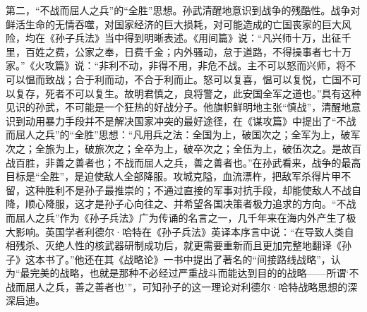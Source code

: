 \documentclass[12pt,UTF8]{ctexbook}
\begin{document}
第二，“不战而屈人之兵”的“全胜”思想。孙武清醒地意识到战争的残酷性。战争对鲜活生命的无情吞噬，对国家经济的巨大损耗，对可能造成的亡国丧家的巨大风险，均在《孙子兵法》当中得到明晰表述。《用间篇》说：“凡兴师十万，出征千里，百姓之费，公家之奉，日费千金；内外骚动，怠于道路，不得操事者七十万家。”《火攻篇》说：“非利不动，非得不用，非危不战。主不可以怒而兴师，将不可以愠而致战；合于利而动，不合于利而止。怒可以复喜，愠可以复悦，亡国不可以复存，死者不可以复生。故明君慎之，良将警之，此安国全军之道也。”具有这种见识的孙武，不可能是一个狂热的好战分子。他旗帜鲜明地主张“慎战”，清醒地意识到动用暴力手段并不是解决国家冲突的最好途径，在《谋攻篇》中提出了“不战而屈人之兵”的“全胜”思想：“凡用兵之法：全国为上，破国次之；全军为上，破军次之；全旅为上，破旅次之；全卒为上，破卒次之；全伍为上，破伍次之。是故百战百胜，非善之善者也；不战而屈人之兵，善之善者也。”在孙武看来，战争的最高目标是“全胜”，是迫使敌人全部降服。攻城克隘，血流漂杵，把敌军杀得片甲不留，这种胜利不是孙子最推崇的；不通过直接的军事对抗手段，却能使敌人不战自降，顺心降服，这才是孙子心向往之、并希望各国决策者极力追求的方向。“不战而屈人之兵”作为《孙子兵法》广为传诵的名言之一，几千年来在海内外产生了极大影响。英国学者利德尔·哈特在《孙子兵法》英译本序言中说：“在导致人类自相残杀、灭绝人性的核武器研制成功后，就更需要重新而且更加完整地翻译《孙子》这本书了。”他还在其《战略论》一书中提出了著名的“间接路线战略”，认为“最完美的战略，也就是那种不必经过严重战斗而能达到目的的战略——所谓‘不战而屈人之兵，善之善者也’”，可知孙子的这一理论对利德尔·哈特战略思想的深深启迪。
\end{document}

